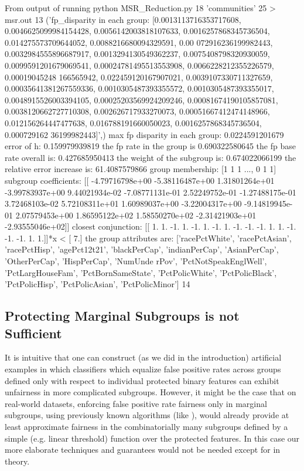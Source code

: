 \iffalse
From output of running python MSR_Reduction.py 18 'communities' 25 > msr.out
13
('fp_disparity in each group: [0.0013113716353717608, 0.0046625099984154428, 0.0056142003818107633, 0.0016257868345736504, 0.014275573709644052, 0.0088216680094329591, 0.00
072916236199982443, 0.0032984555896687917, 0.0013294130549362237, 0.0075408798320930059, 0.0099591201679069541, 0.00024781495513553908, 0.0066228212355226579, 0.00019045248
166565942, 0.022459120167907021, 0.0039107330711327659, 0.00035641381267559336, 0.0010305487393355572, 0.0010305487393355017, 0.0048915526003394105, 0.00025203569924209246,
 0.00081674190105857081, 0.0038120662727710308, 0.002626717933270073, 0.00051667412474148966, 0.012156264447477638, 0.016788191660050023, 0.0016257868345736504, 0.000729162
36199982443]',)
max fp disparity in each group: 0.0224591201679
error of h: 0.159979939819
the fp rate in the group is 0.690322580645
the fp base rate overall is: 0.427685950413
the weight of the subgroup is: 0.674022066199
the relative error increase is: 61.4087579866%
group membership: [1 1 1 ..., 0 1 1]
subgroup coefficients: [[ -4.79716798e+00  -5.38116487e+00   1.31801264e+01  -3.99783937e+00
    9.44021934e-02  -7.08771131e-01   2.52249752e-01  -1.27488175e-01
    3.72468103e-02   5.72108311e+01   1.60989037e+00  -3.22004317e+00
   -9.14819945e-01   2.07579453e+00   1.86595122e+02   1.58550270e+02
   -2.31421903e+01  -2.93555046e+02]]
closest conjunction: [[ 1.  1. -1.  1. -1.  1. -1.  1. -1. -1. -1.  1.  1. -1. -1. -1.  1.  1.]]*x < [ 7.]
the group attributes are: ['racePctWhite', 'racePctAsian', 'racePctHisp', 'agePct12t21', 'blackPerCap', 'indianPerCap', 'AsianPerCap', 'OtherPerCap', 'HispPerCap', 'NumUnde
rPov', 'PctNotSpeakEnglWell', 'PctLargHouseFam', 'PctBornSameState', 'PctPolicWhite', 'PctPolicBlack', 'PctPolicHisp', 'PctPolicAsian', 'PctPolicMinor']
14


\subsection{Protecting Marginal Subgroups is not Sufficient}

It is intuitive that one can construct (as we did in the introduction)
artificial examples in which classifiers which equalize false positive rates across groups defined only with respect to individual protected binary features can exhibit unfairness in more complicated subgroups.
However, it might be the case that on real-world datasets, enforcing false positive rate fairness
only in marginal subgroups, using
previously known algorithms (like  \cite{reductions}), would already provide at least approximate fairness
in the combinatorially many subgroups defined by a simple (e.g. linear threshold) function over the protected features.
In this case our more elaborate techniques and guarantees would not be needed except for in theory.

